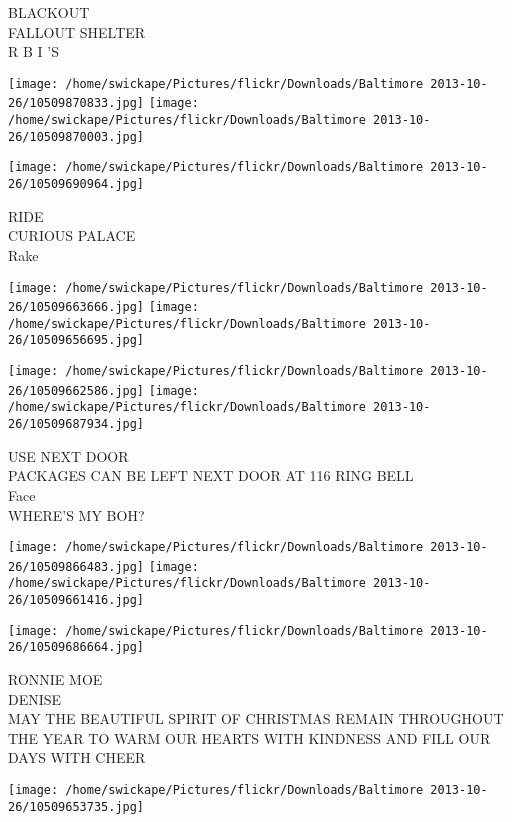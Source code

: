 \documentclass[10pt,letterpaper]{article}
\begin{document}
BLACKOUT\\
FALLOUT SHELTER\\
R B I 'S\\
\pagebreak

\texttt{[image: /home/swickape/Pictures/flickr/Downloads/Baltimore 2013-10-26/10509870833.jpg]}
\texttt{[image: /home/swickape/Pictures/flickr/Downloads/Baltimore 2013-10-26/10509870003.jpg]}

\vspace{0.25in}
\texttt{[image: /home/swickape/Pictures/flickr/Downloads/Baltimore 2013-10-26/10509690964.jpg]}

RIDE\\
CURIOUS PALACE\\
Rake\\
\pagebreak

\texttt{[image: /home/swickape/Pictures/flickr/Downloads/Baltimore 2013-10-26/10509663666.jpg]}
\texttt{[image: /home/swickape/Pictures/flickr/Downloads/Baltimore 2013-10-26/10509656695.jpg]}

\texttt{[image: /home/swickape/Pictures/flickr/Downloads/Baltimore 2013-10-26/10509662586.jpg]}
\texttt{[image: /home/swickape/Pictures/flickr/Downloads/Baltimore 2013-10-26/10509687934.jpg]}

USE NEXT DOOR\\
PACKAGES CAN BE LEFT NEXT DOOR AT 116 RING BELL\\
Face\\
WHERE'S MY BOH?\\
\pagebreak

\texttt{[image: /home/swickape/Pictures/flickr/Downloads/Baltimore 2013-10-26/10509866483.jpg]}
\texttt{[image: /home/swickape/Pictures/flickr/Downloads/Baltimore 2013-10-26/10509661416.jpg]}

\vspace{0.25in}
\texttt{[image: /home/swickape/Pictures/flickr/Downloads/Baltimore 2013-10-26/10509686664.jpg]}

RONNIE MOE\\
DENISE\\
MAY THE BEAUTIFUL SPIRIT OF CHRISTMAS REMAIN THROUGHOUT THE YEAR TO WARM OUR HEARTS WITH KINDNESS AND FILL OUR DAYS WITH CHEER\\
\pagebreak

\texttt{[image: /home/swickape/Pictures/flickr/Downloads/Baltimore 2013-10-26/10509653735.jpg]}
\end{document}

